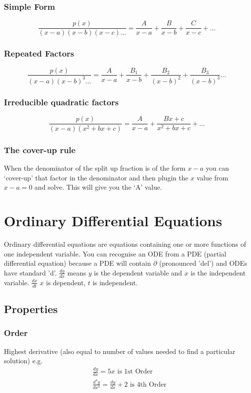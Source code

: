 \documentclass[12pt] {article}
\begin{document}
\subsubsection*{Simple Form}
\begin{equation*}
\frac{p(x)}{(x-a)(x-b)(x-c)\dotsc} = \frac{A}{x-a} + \frac{B}{x-b} + \frac{C}{x-c} + \dotsc
\end{equation*}
\subsubsection*{Repeated Factors}
\begin{equation*}
  \frac{p(x)}{(x-a)(x-b)^3\dotsc} = \frac{A}{x-a} + \frac{B_1}{x-b} + \frac{B_2}{(x-b)^2} + \frac{B_3}{(x-b)^3} \dotsc
\end{equation*}
\subsubsection*{Irreducible quadratic factors}
\begin{equation*}
  \frac{p(x)}{(x-a)(x^2+bx+c)} = \frac{A}{x-a} + \frac{Bx+c}{x^2+bx+c} + \dotsc
\end{equation*}
\subsubsection*{The cover-up rule}
When the denominator of the split up fraction is of the form $x-a$ you can `cover-up' that factor in the denominator
and then plugin the $x$ value from $x-a=0$ and solve. This will give you the `A' value.

\section{Ordinary Differential Equations}
Ordinary differential equations are equations containing one or more functions of one independent variable. 
You can recognise an ODE from a PDE (partial differential equation) because a PDE will contain $\partial$ (pronounced 'del')
and ODEs have standard 'd'. $\frac{dy}{dx}$ means $y$ is the dependent variable and $x$ is the independent variable. $\frac{dx}{dt}$ $x$ is dependent, $t$ is independent.

\subsection*{Properties}
\subsubsection*{Order}
Highest derivative (also equal to number of values needed to find a particular solution) e.g.
\begin{align*}
    &\frac{dy}{dx} = 5x \text{ is 1st Order} \\
    &\frac{d^4y}{dx^4} = \frac{dy}{dx} + 2 \text{ is 4th Order} \\
\end{align*}
\end{document}
